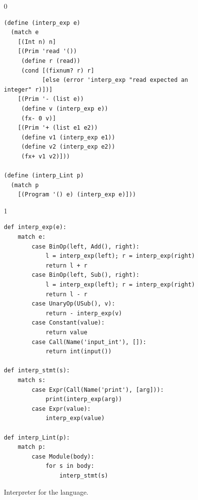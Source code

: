 \documentclass[7x10]{TimesAPriori_MIT}%
\def\racketEd{0}
\def\pythonEd{1}
\def\edition{1}
\begin{document}
\begin{figure}[tp]
{\if\edition\racketEd
\begin{lstlisting}
(define (interp_exp e)
  (match e
    [(Int n) n]
    [(Prim 'read '())
     (define r (read))
     (cond [(fixnum? r) r]
           [else (error 'interp_exp "read expected an integer" r)])]
    [(Prim '- (list e))
     (define v (interp_exp e))
     (fx- 0 v)]
    [(Prim '+ (list e1 e2))
     (define v1 (interp_exp e1))
     (define v2 (interp_exp e2))
     (fx+ v1 v2)]))

(define (interp_Lint p)
  (match p
    [(Program '() e) (interp_exp e)]))
\end{lstlisting}
\fi}
{\if\edition\pythonEd
\begin{lstlisting}
def interp_exp(e):
    match e:
        case BinOp(left, Add(), right):
            l = interp_exp(left); r = interp_exp(right)
            return l + r
        case BinOp(left, Sub(), right):
            l = interp_exp(left); r = interp_exp(right)
            return l - r
        case UnaryOp(USub(), v):
            return - interp_exp(v)
        case Constant(value):
            return value
        case Call(Name('input_int'), []):
            return int(input())            

def interp_stmt(s):
    match s:
        case Expr(Call(Name('print'), [arg])):
            print(interp_exp(arg))
        case Expr(value):
            interp_exp(value)

def interp_Lint(p):
    match p:
        case Module(body):
            for s in body:
                interp_stmt(s)
\end{lstlisting}
\fi}
\caption{Interpreter for the \LangInt{} language.}
\label{fig:interp_Lint}
\end{figure}
\end{document}
